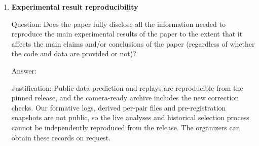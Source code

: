 \documentclass[
]{article}
\begin{document}
\begin{enumerate}
  Question: For each theoretical result, does the paper provide the full
  set of assumptions and a complete (and correct) proof?

  Answer: \answerNA{}

  Justification: The paper has no theorems. The exact calculations of
  Sections 7.2 and 8 and Appendices E and F now distinguish
  conditional-IID Bernoulli assumptions from finite-population sampling
  (Appendix E). Appendix K checks the latter by complete enumeration.
  The regime-model assumptions are not claimed for the full platform.

  Guidelines:

  \begin{itemize}
  \item
    The answer \answerNA{} means that the paper does not include
    theoretical results.
  \item
    All the theorems, formulas, and proofs in the paper should be
    numbered and cross-referenced.
  \item
    All assumptions should be clearly stated or referenced in the
    statement of any theorems.
  \item
    The proofs can either appear in the main paper or the supplemental
    material, but if they appear in the supplemental material, the
    authors are encouraged to provide a short proof sketch to provide
    intuition.
  \item
    Inversely, any informal proof provided in the core of the paper
    should be complemented by formal proofs provided in appendix or
    supplemental material.
  \item
    Theorems and Lemmas that the proof relies upon should be properly
    referenced.
  \end{itemize}
\item
  \textbf{Experimental result reproducibility}

  Question: Does the paper fully disclose all the information needed to
  reproduce the main experimental results of the paper to the extent
  that it affects the main claims and/or conclusions of the paper
  (regardless of whether the code and data are provided or not)?

  Answer: \answerNo{}

  Justification: Public-data prediction and replays are reproducible
  from the pinned release, and the camera-ready archive includes the new
  correction checks. Our formative logs, derived per-pair files and
  pre-registration snapshots are not public, so the live analyses and
  historical selection process cannot be independently reproduced from
  the release. The organizers can obtain these records on request.


\end{enumerate}
\end{document}
